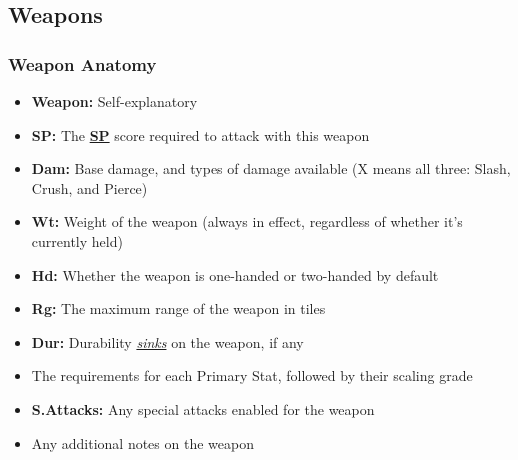 \documentclass[12pt]{article}
\newcommand{\refto}[1]{\hyperlink{#1}{\textbf{#1}}}
\newcommand{\reftoit}[1]{\hyperlink{#1}{\emph{#1}}}
\begin{document}
\subsection{Weapons}
\subsubsection*{Weapon Anatomy}
\begin{itemize}
\item \textbf{Weapon:} Self-explanatory
\item \textbf{SP:} The \refto{SP} score required to attack with this weapon
\item \textbf{Dam:} Base damage, and types of damage available (X means all three: Slash, Crush, and Pierce)
\item \textbf{Wt:} Weight of the weapon (always in effect, regardless of whether it’s currently held)
\item \textbf{Hd:} Whether the weapon is one-handed or two-handed by default
\item \textbf{Rg:} The maximum range of the weapon in tiles
\item \textbf{Dur:} Durability \reftoit{sinks} on the weapon, if any
\item The requirements for each Primary Stat, followed by their scaling grade
\item \textbf{S.Attacks:} Any special attacks enabled for the weapon
\item Any additional notes on the weapon
\end{itemize}
\end{document}
